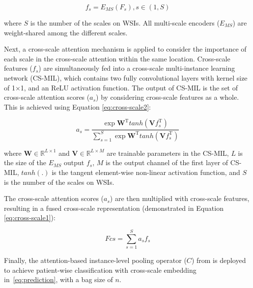\documentclass[times,twocolumn,final]{elsarticle}
\begin{document}
\begin{equation}
    f_s = E_{MS}(F_s), s \in (1, S)
\label{eq:MI-FCN}
\end{equation}

\noindent where $S$ is the number of the scales on WSIs. 
All multi-scale encoders ($E_{MS}$) are weight-shared among the different scales.


Next, a cross-scale attention mechanism is applied to consider the importance of each scale in the cross-scale attention within the same location. Cross-scale features ($f_s$) are simultaneously fed into a cross-scale multi-instance learning network (CS-MIL), which contains two fully convolutional layers with kernel size of 1$\times$1, and an ReLU activation function. The output of CS-MIL is the set of cross-scale attention scores ($a_s$) by considering cross-scale features as a whole. This is achieved using Equation \ref{eq:cross-scale2}: 


\begin{equation}
a_s = \frac{\exp{\mathbf{W}^\mathrm{T}tanh(\mathbf{V}f_s^\mathrm{T})}}{\sum_{s=1}^S\exp{\mathbf{W}^\mathrm{T}tanh(\mathbf{V}f_s^\mathrm{T})}}
\label{eq:cross-scale2}
\end{equation}


\noindent where $\mathbf{W} \in\mathbb{R}^{L \times 1}$ and $\mathbf{V} \in\mathbb{R}^{L \times M}$ are trainable parameters in the CS-MIL, $L$ is the size of the $E_{MS}$ output $f_s$, $M$ is the output channel of the first layer of CS-MIL, $tanh(.)$ is the tangent element-wise non-linear activation function, and $S$ is the number of the scales on WSIs.

The cross-scale attention scores ($a_s$) are then multiplied with cross-scale features, resulting in a fused cross-scale representation (demonstrated in Equation \ref{eq:cross-scale1}):

\begin{equation}
Fcs = \sum_{s=1}^S a_sf_s
\label{eq:cross-scale1}
\end{equation}

Finally, the attention-based instance-level pooling operator ($C$) from \citep{yao2020whole} is deployed to achieve patient-wise classification with cross-scale embedding in~\ref{eq:prediction}, with a bag size of $n$.
\end{document}

